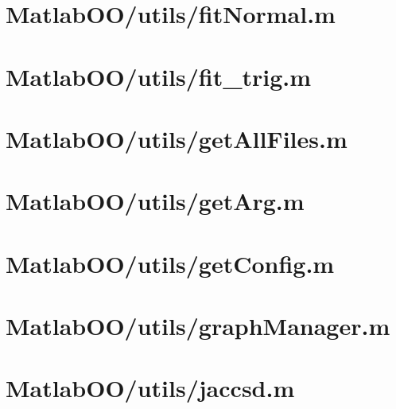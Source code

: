 \pagebreak
\section{MatlabOO/utils/fitNormal.m}\label{code:MatlabOO/utils/fitNormal.m}


\pagebreak
\section{MatlabOO/utils/fit\_trig.m}\label{code:MatlabOO/utils/fit_trig.m}


\pagebreak
\section{MatlabOO/utils/getAllFiles.m}\label{code:MatlabOO/utils/getAllFiles.m}


\pagebreak
\section{MatlabOO/utils/getArg.m}\label{code:MatlabOO/utils/getArg.m}


\pagebreak
\section{MatlabOO/utils/getConfig.m}\label{code:MatlabOO/utils/getConfig.m}


\pagebreak
\section{MatlabOO/utils/graphManager.m}\label{code:MatlabOO/utils/graphManager.m}


\pagebreak
\section{MatlabOO/utils/jaccsd.m}\label{code:MatlabOO/utils/jaccsd.m}


